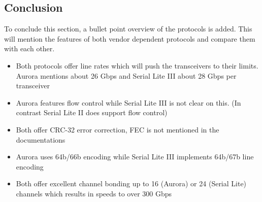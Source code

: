 \subsection{Conclusion}
To conclude this section, a bullet point overview of the protocols is added. This will mention the features of both vendor dependent protocols and compare them with each other.\\
\begin{itemize}
	\item Both protocols offer line rates which will push the transceivers to their limits. Aurora mentions about 26 Gbps and Serial Lite III about 28 Gbps per transceiver
	\item Aurora features flow control while Serial Lite III is not clear on this. (In contrast Serial Lite II does support flow control)
	\item Both offer CRC-32 error correction, FEC is not mentioned in the documentations
	\item Aurora uses 64b/66b encoding while Serial Lite III implements 64b/67b line encoding
	\item Both offer excellent channel bonding up to 16 (Aurora) or 24 (Serial Lite) channels which results in speeds to over 300 Gbps \newline
\end{itemize}
\newpage 